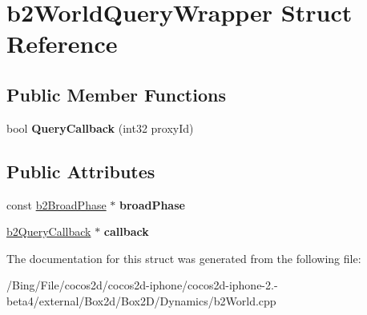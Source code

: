 \hypertarget{structb2_world_query_wrapper}{\section{b2\-World\-Query\-Wrapper Struct Reference}
\label{structb2_world_query_wrapper}
}
\subsection*{Public Member Functions}
\begin{DoxyCompactItemize}
\item 
\hypertarget{structb2_world_query_wrapper_a660a482e5a15b7f40a103b2dfb1711c1}{bool {\bfseries Query\-Callback} (int32 proxy\-Id)}\label{structb2_world_query_wrapper_a660a482e5a15b7f40a103b2dfb1711c1}

\end{DoxyCompactItemize}
\subsection*{Public Attributes}
\begin{DoxyCompactItemize}
\item 
\hypertarget{structb2_world_query_wrapper_ab85c542cfaf43d2ecf31fcbfd8c0c792}{const \hyperlink{classb2_broad_phase}{b2\-Broad\-Phase} $\ast$ {\bfseries broad\-Phase}}\label{structb2_world_query_wrapper_ab85c542cfaf43d2ecf31fcbfd8c0c792}

\item 
\hypertarget{structb2_world_query_wrapper_a3af9f06dfa228974fecabd2bb2b07d2e}{\hyperlink{classb2_query_callback}{b2\-Query\-Callback} $\ast$ {\bfseries callback}}\label{structb2_world_query_wrapper_a3af9f06dfa228974fecabd2bb2b07d2e}

\end{DoxyCompactItemize}


The documentation for this struct was generated from the following file\-:\begin{DoxyCompactItemize}
\item 
/\-Bing/\-File/cocos2d/cocos2d-\/iphone/cocos2d-\/iphone-\/2.-\/beta4/external/\-Box2d/\-Box2\-D/\-Dynamics/b2\-World.\-cpp\end{DoxyCompactItemize}
